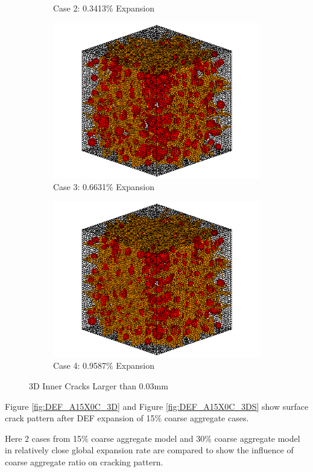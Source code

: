 \begin{figure}[!h]
\begin{subfigure}{.5\textwidth}
    \caption{Case 2: 0.3413\% Expansion}
    \end{subfigure}%
    \begin{subfigure}{.5\textwidth}
      \centering
      \includegraphics[width=.8\linewidth]{Files/exp_3D/DEF/A15X0C_3_c.png}
    \caption{Case 3: 0.6631\% Expansion}
    \end{subfigure}
    \begin{subfigure}{.5\textwidth}
      \centering
      \includegraphics[width=.8\linewidth]{Files/exp_3D/DEF/A15X0C_4_c.png}
    \caption{Case 4: 0.9587\% Expansion}
    \end{subfigure}%

  \caption{3D Inner Cracks Larger than 0.03mm}
  \label{fig:ASR_A15X0C_crack}
\end{figure}

Figure \ref{fig:DEF_A15X0C_3D} and Figure \ref{fig:DEF_A15X0C_3DS} show surface crack pattern after DEF expansion of 15\% coarse aggregate cases.

Here 2 cases from 15\% coarse aggregate model and 30\% coarse aggregate model in relatively close global expansion rate are compared to show the influence of coarse aggregate ratio on cracking pattern.

